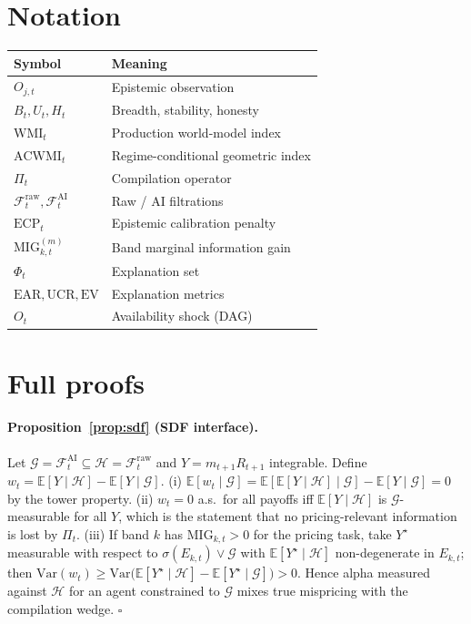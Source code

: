 \documentclass[12pt]{article}
\begin{document}
\section{Notation}
\label{app:notation}
\begin{center}
\begin{tabular}{ll}
\toprule
Symbol & Meaning \\
\midrule
$O_{j,t}$ & Epistemic observation \\
$B_t,U_t,H_t$ & Breadth, stability, honesty \\
$\mathrm{WMI}_t$ & Production world-model index \\
$\mathrm{ACWMI}_t$ & Regime-conditional geometric index \\
$\Pi_t$ & Compilation operator \\
$\mathcal{F}^{\mathrm{raw}}_t,\mathcal{F}^{\mathrm{AI}}_t$ & Raw / AI filtrations \\
$\mathrm{ECP}_t$ & Epistemic calibration penalty \\
$\mathrm{MIG}^{(m)}_{k,t}$ & Band marginal information gain \\
$\Phi_t$ & Explanation set \\
$\mathrm{EAR},\mathrm{UCR},\mathrm{EV}$ & Explanation metrics \\
$O_t$ & Availability shock (DAG) \\
\bottomrule
\end{tabular}
\end{center}

\section{Full proofs}
\label{app:proofs}

\paragraph{Proposition~\ref{prop:sdf} (SDF interface).}
Let $\mathcal{G}=\mathcal{F}^{\mathrm{AI}}_t\subseteq\mathcal{H}=\mathcal{F}^{\mathrm{raw}}_t$ and $Y=m_{t+1}R_{t+1}$ integrable. Define $w_t=\mathbb{E}[Y\mid\mathcal{H}]-\mathbb{E}[Y\mid\mathcal{G}]$. (i) $\mathbb{E}[w_t\mid\mathcal{G}]=\mathbb{E}[\mathbb{E}[Y\mid\mathcal{H}]\mid\mathcal{G}]-\mathbb{E}[Y\mid\mathcal{G}]=0$ by the tower property. (ii) $w_t=0$ a.s.\ for all payoffs iff $\mathbb{E}[Y\mid\mathcal{H}]$ is $\mathcal{G}$-measurable for all $Y$, which is the statement that no pricing-relevant information is lost by $\Pi_t$. (iii) If band $k$ has $\mathrm{MIG}_{k,t}>0$ for the pricing task, take $Y^\star$ measurable with respect to $\sigma(E_{k,t})\vee\mathcal{G}$ with $\mathbb{E}[Y^\star\mid\mathcal{H}]$ non-degenerate in $E_{k,t}$; then $\mathrm{Var}(w_t)\ge\mathrm{Var}\bigl(\mathbb{E}[Y^\star\mid\mathcal{H}]-\mathbb{E}[Y^\star\mid\mathcal{G}]\bigr)>0$. Hence alpha measured against $\mathcal{H}$ for an agent constrained to $\mathcal{G}$ mixes true mispricing with the compilation wedge. \hfill$\square$
\end{document}
